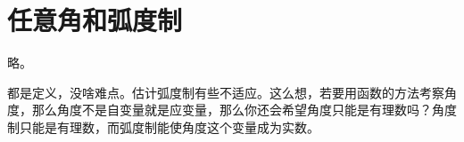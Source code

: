 \section{任意角和弧度制}

略。

都是定义，没啥难点。估计弧度制有些不适应。这么想，若要用函数的方法考察角度，那么角度不是自变量就是应变量，那么你还会希望角度只能是有理数吗？角度制只能是有理数，而弧度制能使角度这个变量成为实数。




